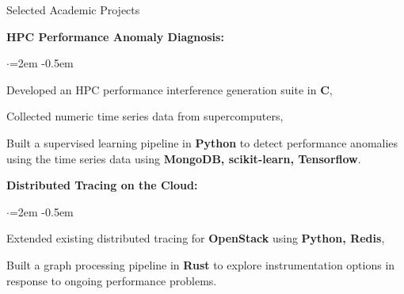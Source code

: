 \documentclass{resume}
\begin{document}

\begin{rSection}{Selected Academic Projects} \itemsep -2pt
\item {\bf HPC Performance Anomaly Diagnosis:}
  \begin{list}{$\cdot$}{\leftmargin=2em} %
    \itemsep -0.5em \vspace{-0.5em} %
  \item Developed an HPC performance interference generation suite in {\bf C},
  \item Collected numeric time series data from supercomputers,
  \item Built a supervised learning pipeline in {\bf Python} to detect
    performance anomalies using the time series data using {\bf MongoDB,
      scikit-learn, Tensorflow}.
  \end{list}
  \item {\bf Distributed Tracing on the Cloud:}
  \begin{list}{$\cdot$}{\leftmargin=2em} %
    \itemsep -0.5em \vspace{-0.5em} %
  \item Extended existing distributed tracing for {\bf OpenStack} using {\bf
      Python, Redis},
  \item Built a graph processing pipeline in {\bf Rust} to explore
    instrumentation options in response to ongoing performance problems.
  \end{list}
\end{rSection}

\end{document}
